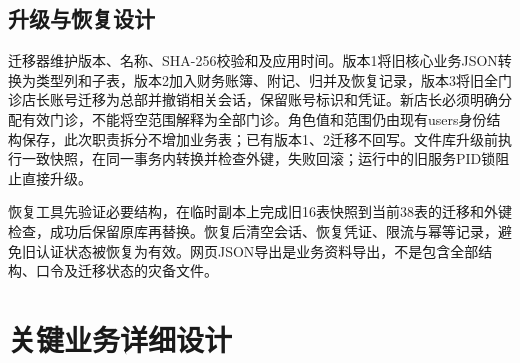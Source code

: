 \documentclass[UTF8,12pt,a4paper,fontset=none]{ctexart}
\begin{document}
\subsection{升级与恢复设计}
迁移器维护版本、名称、SHA-256校验和及应用时间。版本1将旧核心业务JSON转换为类型列和子表，版本2加入财务账簿、附记、归并及恢复记录，版本3将旧全门诊店长账号迁移为总部并撤销相关会话，保留账号标识和凭证。新店长必须明确分配有效门诊，不能将空范围解释为全部门诊。角色值和范围仍由现有users身份结构保存，此次职责拆分不增加业务表；已有版本1、2迁移不回写。文件库升级前执行一致快照，在同一事务内转换并检查外键，失败回滚；运行中的旧服务PID锁阻止直接升级。\par
恢复工具先验证必要结构，在临时副本上完成旧16表快照到当前38表的迁移和外键检查，成功后保留原库再替换。恢复后清空会话、恢复凭证、限流与幂等记录，避免旧认证状态被恢复为有效。网页JSON导出是业务资料导出，不是包含全部结构、口令及迁移状态的灾备文件。\par
{}
\section{关键业务详细设计}
\end{document}
